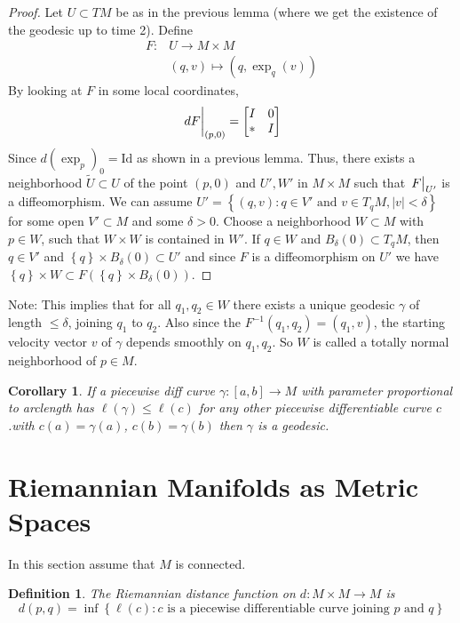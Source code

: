 \documentclass[a4paper]{article}
\newtheorem*{defn}{Definition}
\newtheorem*{cor}{Corollary}
\begin{document}
\begin{proof}
  Let $U \subset TM$ be as in the previous lemma (where we get the existence of the geodesic up to time 2). Define 
  \[
    \begin{aligned}
      F: &U \rightarrow M \times M \\
         &(q,v) \mapsto (q, \exp_q(v))
    \end{aligned}
  \]
  By looking at $F$ in some local coordinates,
  \[
    \eval{dF}_{(p,0)} = 
    \begin{bmatrix}
      I & 0 \\
      *  & I
    \end{bmatrix}
  \]
  Since $d(\exp_p)_0 = \text{Id}$ as shown in a previous lemma. Thus, there exists a neighborhood $\tilde{U} \subset U$ of the point $(p,0)$ and $U',W'$ in $M \times M$ such that $\eval{F}_{U'}$ is a diffeomorphism. We can assume $U' = \left\{ (q,v): q \in V' \text{ and } v \in T_qM, |v| < \delta \right\}$ for some open $V' \subset M$ and some $\delta > 0$. Choose a neighborhood $W \subset M$ with $p \in W$, such that  $W \times W$ is contained in $W'$. If $q \in W$ and $B_{\delta}(0) \subset T_qM$, then $q \in V'$ and $\left\{ q \right\} \times B_{\delta}(0) \subset U'$ and since $F$ is a diffeomorphism on $U'$ we have $\left\{ q \right\} \times W \subset F(\left\{ q \right\} \times B_{\delta}(0)).$ 
\end{proof}

Note: This implies that for all $q_1, q_2 \in W$ there exists a unique geodesic $\gamma$ of length $\leq \delta$, joining $q_1$ to $q_2$. Also since the $F^{-1}(q_1, q_2) = (q_1, v)$, the starting velocity vector $v$ of $\gamma$ depends smoothly on $q_1, q_2$. So $W$ is called a totally normal neighborhood of $p \in M$.

\begin{cor}
  If a piecewise diff curve $\gamma: [a,b] \rightarrow M$ with parameter proportional to arclength has $\ell(\gamma) \leq \ell(c)$ for any other piecewise differentiable curve $c$.with $c(a) = \gamma(a)$, $c(b) = \gamma(b)$ then $\gamma$ is a geodesic.
\end{cor}

\section*{Riemannian Manifolds as Metric Spaces}%
In this section assume that $M$ is connected.

\begin{defn}
 The Riemannian distance function on $d:M\times M \rightarrow M$ is  
 \[
   d(p,q) = \inf \left\{ \ell(c): c\text{ is a piecewise differentiable curve joining } p \text{ and } q \right\}
 \]
\end{defn}
\end{document}
